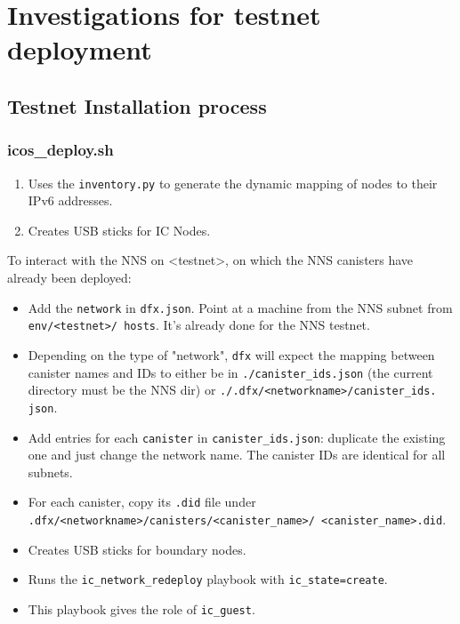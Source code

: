 \chapter{Investigations for testnet deployment}
\label{chap:chapterfour}

\section{Testnet Installation process}

\subsection{icos\_deploy.sh}

\begin{enumerate}
    \item Uses the \texttt{inventory.py} to generate the dynamic mapping of nodes to their IPv6 addresses.
    \item Creates USB sticks for IC Nodes.
\end{enumerate}

To interact with the NNS on <testnet>, on which the NNS canisters have already been deployed:
\begin{itemize}
    \item Add the \texttt{network} in \texttt{dfx.json}. Point at a machine from the NNS subnet from \texttt{env/<testnet>/
    hosts}. It's already done for the NNS testnet.
    \item Depending on the type of "network", \texttt{dfx} will expect the mapping between canister names and IDs to either be 
    in \texttt{./canister\_ids.json} (the current directory must be the NNS dir) or \texttt{./.dfx/<networkname>/canister\_ids.
    json}.
    \item Add entries for each \texttt{canister} in \texttt{canister\_ids.json}: duplicate the existing one and just change the 
    network name. The canister IDs are identical for all subnets.
    \item For each canister, copy its \texttt{.did} file under 
    \texttt{.dfx/<networkname>/canisters/<canister\_name>/  <canister\_name>.did}.
    \item Creates USB sticks for boundary nodes.
    \item Runs the \texttt{ic\_network\_redeploy} playbook with \texttt{ic\_state=create}.
    \item This playbook gives the role of \texttt{ic\_guest}.
\end{itemize}

